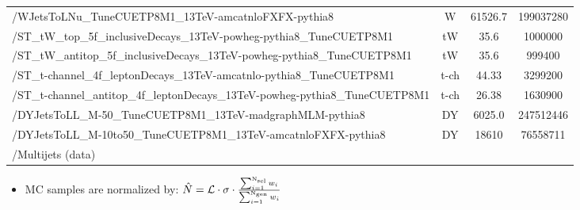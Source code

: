\documentclass{beamer}
\begin{document}
\begin{frame}
\begin{table}[t]
\begin{tabular}{!{\color{purple}\vrule}l!{\color{purple}\vrule}c!{\color{purple}\vrule}c!{\color{purple}\vrule}c!{\color{purple}\vrule}}
/WJetsToLNu\_TuneCUETP8M1\_13TeV-amcatnloFXFX-pythia8 & W & 61526.7 & 199037280\\
/ST\_tW\_top\_5f\_inclusiveDecays\_13TeV-powheg-pythia8\_TuneCUETP8M1 & tW & 35.6 & 1000000\\
/ST\_tW\_antitop\_5f\_inclusiveDecays\_13TeV-powheg-pythia8\_TuneCUETP8M1 & tW & 35.6 & 999400\\
/ST\_t-channel\_4f\_leptonDecays\_13TeV-amcatnlo-pythia8\_TuneCUETP8M1 & t-ch & 44.33 & 3299200\\
/ST\_t-channel\_antitop\_4f\_leptonDecays\_13TeV-powheg-pythia8\_TuneCUETP8M1 & t-ch & 26.38 & 1630900\\
/DYJetsToLL\_M-50\_TuneCUETP8M1\_13TeV-madgraphMLM-pythia8 & DY & 6025.0 & 247512446\\
/DYJetsToLL\_M-10to50\_TuneCUETP8M1\_13TeV-amcatnloFXFX-pythia8 & DY & 18610 & 76558711\\
/Multijets (data) & & &\\
\toprule
\end{tabular}
\end{table}
\begin{itemize}
\tiny
\item MC samples are normalized by:
$\hat{N}=\mathcal{L}\cdot\sigma\cdot\frac{\sum_{i=1}^{\rm N_{sel}} w_i}{\sum_{i=1}^{\rm N_{gen}} w_i}$
\end{itemize}
\end{frame}
\end{document}
